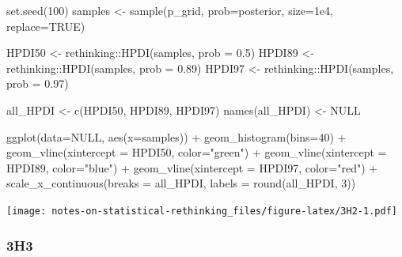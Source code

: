 \documentclass[
]{book}
\newenvironment{Shaded}{\begin{snugshade}}{\end{snugshade}}
\newcommand{\AttributeTok}[1]{\textcolor[rgb]{0.77,0.63,0.00}{#1}}
\newcommand{\ConstantTok}[1]{\textcolor[rgb]{0.00,0.00,0.00}{#1}}
\newcommand{\DecValTok}[1]{\textcolor[rgb]{0.00,0.00,0.81}{#1}}
\newcommand{\FloatTok}[1]{\textcolor[rgb]{0.00,0.00,0.81}{#1}}
\newcommand{\FunctionTok}[1]{\textcolor[rgb]{0.00,0.00,0.00}{#1}}
\newcommand{\NormalTok}[1]{#1}
\newcommand{\OtherTok}[1]{\textcolor[rgb]{0.56,0.35,0.01}{#1}}
\newcommand{\SpecialCharTok}[1]{\textcolor[rgb]{0.00,0.00,0.00}{#1}}
\newcommand{\StringTok}[1]{\textcolor[rgb]{0.31,0.60,0.02}{#1}}
\begin{document}
\begin{Shaded}
\begin{Highlighting}[]
\FunctionTok{set.seed}\NormalTok{(}\DecValTok{100}\NormalTok{)}
\NormalTok{samples }\OtherTok{\textless{}{-}} \FunctionTok{sample}\NormalTok{(p\_grid, }\AttributeTok{prob=}\NormalTok{posterior, }\AttributeTok{size=}\FloatTok{1e4}\NormalTok{, }\AttributeTok{replace=}\ConstantTok{TRUE}\NormalTok{)}

\NormalTok{HPDI50 }\OtherTok{\textless{}{-}}\NormalTok{ rethinking}\SpecialCharTok{::}\FunctionTok{HPDI}\NormalTok{(samples, }\AttributeTok{prob =} \FloatTok{0.5}\NormalTok{)}
\NormalTok{HPDI89 }\OtherTok{\textless{}{-}}\NormalTok{ rethinking}\SpecialCharTok{::}\FunctionTok{HPDI}\NormalTok{(samples, }\AttributeTok{prob =} \FloatTok{0.89}\NormalTok{)}
\NormalTok{HPDI97 }\OtherTok{\textless{}{-}}\NormalTok{ rethinking}\SpecialCharTok{::}\FunctionTok{HPDI}\NormalTok{(samples, }\AttributeTok{prob =} \FloatTok{0.97}\NormalTok{)}

\NormalTok{all\_HPDI }\OtherTok{\textless{}{-}} \FunctionTok{c}\NormalTok{(HPDI50, HPDI89, HPDI97)}
\FunctionTok{names}\NormalTok{(all\_HPDI) }\OtherTok{\textless{}{-}} \ConstantTok{NULL}


\FunctionTok{ggplot}\NormalTok{(}\AttributeTok{data=}\ConstantTok{NULL}\NormalTok{, }\FunctionTok{aes}\NormalTok{(}\AttributeTok{x=}\NormalTok{samples)) }\SpecialCharTok{+} 
  \FunctionTok{geom\_histogram}\NormalTok{(}\AttributeTok{bins=}\DecValTok{40}\NormalTok{) }\SpecialCharTok{+} 
  \FunctionTok{geom\_vline}\NormalTok{(}\AttributeTok{xintercept =}\NormalTok{ HPDI50, }\AttributeTok{color=}\StringTok{"green"}\NormalTok{) }\SpecialCharTok{+}
  \FunctionTok{geom\_vline}\NormalTok{(}\AttributeTok{xintercept =}\NormalTok{ HPDI89, }\AttributeTok{color=}\StringTok{"blue"}\NormalTok{) }\SpecialCharTok{+} 
  \FunctionTok{geom\_vline}\NormalTok{(}\AttributeTok{xintercept =}\NormalTok{ HPDI97, }\AttributeTok{color=}\StringTok{"red"}\NormalTok{) }\SpecialCharTok{+}
  \FunctionTok{scale\_x\_continuous}\NormalTok{(}\AttributeTok{breaks =}\NormalTok{ all\_HPDI, }\AttributeTok{labels =} \FunctionTok{round}\NormalTok{(all\_HPDI, }\DecValTok{3}\NormalTok{))}
\end{Highlighting}
\end{Shaded}

\texttt{[image: notes-on-statistical-rethinking\_files/figure-latex/3H2-1.pdf]}

\hypertarget{h3-1}{%
\subsubsection*{3H3}\label{h3-1}}
\end{document}
